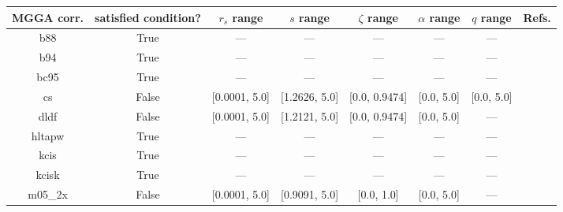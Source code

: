 \begin{tabular}{|c|c|c|c|c|c|c|l|}
\hline
   MGGA corr. &  satisfied condition? &      $r_s$ range &        $s$ range &    $\zeta$ range & $\alpha$ range & $q$ range  &                                                                              Refs. \\ \hline
          b88 &                  True &              --- &              --- &              --- &            --- &        --- &                                                              \cite{Becke1988_1053} \\ \hline
          b94 &                  True &              --- &              --- &              --- &            --- &        --- &                                                               \cite{Becke1994_625} \\ \hline
         bc95 &                  True &              --- &              --- &              --- &            --- &        --- &                                                              \cite{Becke1996_1040} \\ \hline
           cs &                 False &    [0.0001, 5.0] &    [1.2626, 5.0] &    [0.0, 0.9474] &     [0.0, 5.0] & [0.0, 5.0] &                                                   \cite{Colle1975_329,Lee1988_785} \\ \hline
         dldf &                 False &    [0.0001, 5.0] &    [1.2121, 5.0] &    [0.0, 0.9474] &     [0.0, 5.0] &        --- &                                                           \cite{Pernal2009_263201} \\ \hline
       hltapw &                  True &              --- &              --- &              --- &            --- &        --- &                                                             \cite{Lehtola2021_943} \\ \hline
         kcis &                  True &              --- &              --- &              --- &            --- &        --- & \cite{Rey1998_581,Krieger1999_463,Krieger2001_48,Kurth1999_889,Toulouse2002_10465} \\ \hline
        kcisk &                  True &              --- &              --- &              --- &            --- &        --- & \cite{Rey1998_581,Krieger1999_463,Krieger2001_48,Kurth1999_889,Toulouse2002_10465} \\ \hline
      m05\_2x &                 False &    [0.0001, 5.0] &    [0.9091, 5.0] &       [0.0, 1.0] &     [0.0, 5.0] &        --- &                                                                \cite{Zhao2006_364} \\ \hline

\end{tabular}
